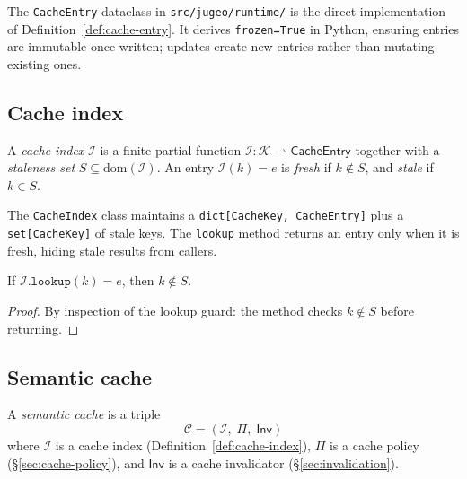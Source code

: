 \documentclass[11pt]{article}
\newcommand{\Cache}{\mathcal{C}}                   %
\newcommand{\CacheIndex}{\mathcal{I}}              %
\newcommand{\CachePol}{\Pi}                        %
\newcommand{\CacheInval}{\mathsf{Inv}}             %
\begin{document}
The \texttt{CacheEntry} dataclass in \texttt{src/jugeo/runtime/} is
the direct implementation of Definition~\ref{def:cache-entry}.  It
derives \texttt{frozen=True} in Python, ensuring entries are
immutable once written; updates create new entries rather than mutating
existing ones.

\subsection{Cache index}

\begin{definition}\label{def:cache-index}
A \emph{cache index} $\CacheIndex$ is a finite partial function
$\CacheIndex : \mathcal{K} \rightharpoonup \mathsf{CacheEntry}$
together with a \emph{staleness set}
$S \subseteq \mathrm{dom}(\CacheIndex)$.  An entry
$\CacheIndex(k) = e$ is \emph{fresh} if $k \notin S$, and
\emph{stale} if $k \in S$.
\end{definition}

The \texttt{CacheIndex} class maintains a \texttt{dict[CacheKey,
CacheEntry]} plus a \texttt{set[CacheKey]} of stale keys.  The
\texttt{lookup} method returns an entry only when it is fresh,
hiding stale results from callers.

\begin{proposition}\label{prop:lookup-sound}
If $\CacheIndex.\mathtt{lookup}(k) = e$, then $k \notin S$.
\end{proposition}
\begin{proof}
By inspection of the lookup guard: the method checks
$k \notin S$ before returning.
\end{proof}

\subsection{Semantic cache}

\begin{definition}\label{def:semantic-cache}
A \emph{semantic cache} is a triple
\[
  \Cache = (\CacheIndex,\; \CachePol,\; \CacheInval)
\]
where $\CacheIndex$ is a cache index
(Definition~\ref{def:cache-index}), $\CachePol$ is a cache policy
(\S\ref{sec:cache-policy}), and $\CacheInval$ is a cache invalidator
(\S\ref{sec:invalidation}).
\end{definition}
\end{document}
